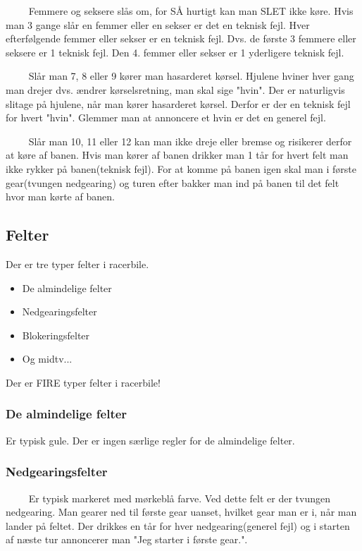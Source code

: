 \documentclass[12pt]{article}
\begin{document}
$\qquad$ Femmere og seksere slås om, for SÅ hurtigt kan man SLET ikke køre. Hvis man 3 gange slår en femmer eller en sekser er det en teknisk fejl. Hver efterfølgende femmer eller sekser er en teknisk fejl. Dvs. de første 3 femmere eller seksere er 1 teknisk fejl. Den 4. femmer eller sekser er 1 yderligere teknisk fejl.

$\qquad$ Slår man 7, 8 eller 9 kører man hasarderet kørsel. Hjulene hviner hver gang man drejer dvs. ændrer kørselsretning, man skal sige "hvin". Der er naturligvis slitage på hjulene, når man kører hasarderet kørsel. Derfor er der en teknisk fejl for hvert "hvin". Glemmer man at annoncere et hvin er det en generel fejl.

$\qquad$  Slår man 10, 11 eller 12 kan man ikke dreje eller bremse og risikerer derfor at køre af banen. Hvis man kører af banen drikker man 1 tår for hvert felt man ikke rykker på banen(teknisk fejl). For at komme på banen igen skal man i første gear(tvungen nedgearing) og turen efter bakker man ind på banen til det felt hvor man kørte af banen.

\subsection*{Felter}

Der er tre typer felter i racerbile.

\begin{itemize}
	\item De almindelige felter
	\item Nedgearingsfelter
	\item Blokeringsfelter
	\item Og midtv...
\end{itemize}

Der er FIRE typer felter i racerbile!

\subsubsection*{De almindelige felter}

Er typisk gule. Der er ingen særlige regler for de almindelige felter.

\subsubsection*{Nedgearingsfelter}

$\qquad$ Er typisk markeret med mørkeblå farve. Ved dette felt er der tvungen nedgearing. Man gearer ned til første gear uanset, hvilket gear man er i, når man lander på feltet. Der drikkes en tår for hver nedgearing(generel fejl) og i starten af næste tur annoncerer man "Jeg starter i første gear.".
\end{document}
